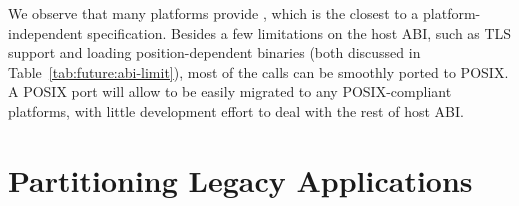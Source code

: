 We observe that many platforms provide ,
which is the closest to a platform-independent specification.
Besides a few limitations on the \graphene{} host ABI,
such as TLS support and loading position-dependent binaries (both discussed in Table~\ref{tab:future:abi-limit}),
most of the \pal{} calls can be smoothly ported to POSIX.
A POSIX port will allow \graphene{} to be easily migrated to any POSIX-compliant platforms,
with little development effort to deal with
the rest of host ABI.








\section{Partitioning Legacy Applications}
\label{sec:future:partitioning}


%


